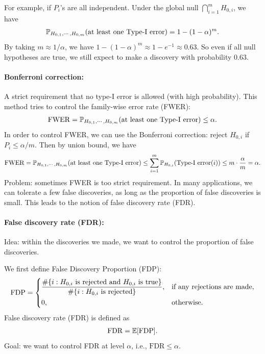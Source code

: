 \documentclass[11pt,letterpaper]{article}
\numberwithin{assumption}{lecture}
\numberwithin{theorem}{lecture}
\numberwithin{proposition}{lecture}
\numberwithin{lemma}{lecture}
\numberwithin{claim}{lecture}
\numberwithin{corollary}{lecture}
\numberwithin{definition}{lecture}
\numberwithin{conjecture}{lecture}
\numberwithin{remark}{lecture}
\numberwithin{example}{lecture}
\numberwithin{equation}{lecture}
\begin{document}
For example, if $P_i$'s are all independent. Under the global null $\bigcap_{i=1}^m H_{0, i}$, we have
\begin{align*}
  {\mathbb{P}}_{H_{0, 1}, \cdots, H_{0, m}} (\mbox{at least one Type-I error}) = 1 - (1 - \alpha)^m.
\end{align*}
By taking $m \approx 1/ \alpha$, we have $1 - (1 - \alpha)^m \approx 1 - e^{-1} \approx 0.63$. So even if all null hypotheses are true, we still expect to make a discovery with probability $0.63$.

\paragraph{Bonferroni correction:} A strict requirement that no type-I error is allowed (with high probability). This method tries to control the family-wise error rate (FWER):
\begin{align*}
  \mathrm{FWER} = {\mathbb{P}}_{H_{0, 1}, \cdots, H_{0, m}} (\mbox{at least one Type-I error}) \leq \alpha.
\end{align*}
In order to control FWER, we can use the Bonferroni correction: reject $H_{0, i}$ if $P_i \leq \alpha / m$. Then by union bound, we have
\begin{align*}
  \mathrm{FWER} = {\mathbb{P}}_{H_{0, 1}, \cdots, H_{0, m}} (\mbox{at least one Type-I error}) \leq \sum_{i=1}^m {\mathbb{P}}_{H_{0, i}} (\mbox{Type-I error} (i)) \leq m \cdot \frac{\alpha}{m} = \alpha.
\end{align*}
Problem: sometimes FWER is too strict requirement. In many applications, we can tolerate a few false discoveries, as long as the proportion of false discoveries is small. This leads to the notion of false discovery rate (FDR).

\paragraph{False discovery rate (FDR):} Idea: within the discoveries we made, we want to control the proportion of false discoveries.

We first define False Discovery Proportion (FDP):
\begin{align*}
  \mathrm{FDP} = \begin{dcases}\frac{\# \{ i: H_{0, i} \text{ is rejected and } H_{0, i} \text{ is true} \}}{\# \{ i: H_{0, i} \text{ is rejected} \}}, & \text{if any rejections are made},\\
  0, & \text{otherwise} .
  \end{dcases}
\end{align*}
False discovery rate (FDR) is defined as
\begin{align*}
  \mathrm{FDR} = {\mathbb{E}} [\mathrm{FDP}].
\end{align*}
Goal: we want to control FDR at level $\alpha$, i.e., $\mathrm{FDR} \leq \alpha$.
\end{document}
